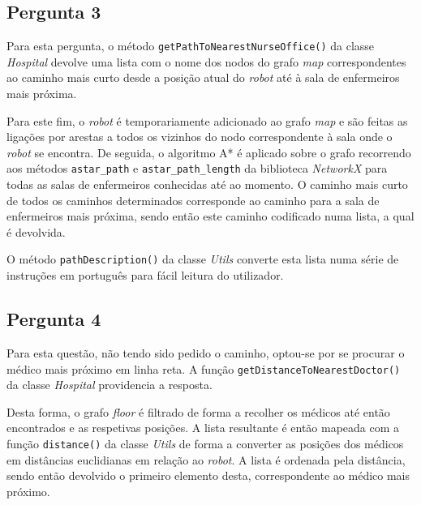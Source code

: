 \subsection{Pergunta 3}
\label{ssec::implement:details:perg3}


Para esta pergunta, o método \texttt{getPathToNearestNurseOffice()} da classe \textit{Hospital} devolve uma lista com o nome dos nodos do grafo \textit{map} correspondentes ao caminho mais curto desde a posição atual do \textit{robot} até à sala de enfermeiros mais próxima.

Para este fim, o \textit{robot} é temporariamente adicionado ao grafo \textit{map} e são feitas as ligações por arestas a todos os vizinhos do nodo correspondente à sala onde o \textit{robot} se encontra. De seguida, o algoritmo A* é aplicado sobre o grafo recorrendo aos métodos \texttt{astar\_path} e \texttt{astar\_path\_length} da biblioteca \textit{NetworkX} para todas as salas de enfermeiros conhecidas até ao momento. O caminho mais curto de todos os caminhos determinados corresponde ao caminho para a sala de enfermeiros mais próxima, sendo então este caminho codificado numa lista, a qual é devolvida.

O método \texttt{pathDescription()} da classe \textit{Utils} converte esta lista numa série de instruções em português para fácil leitura do utilizador.


\subsection{Pergunta 4}
\label{ssec::implement:details:perg4}


Para esta questão, não tendo sido pedido o caminho, optou-se por se procurar o médico mais próximo em linha reta. A função \texttt{getDistanceToNearestDoctor()} da classe \textit{Hospital} providencia a resposta.

Desta forma, o grafo \textit{floor} é filtrado de forma a recolher os médicos até então encontrados e as respetivas posições. A lista resultante é então mapeada com a função \texttt{distance()} da classe \textit{Utils} de forma a converter as posições dos médicos em distâncias euclidianas em relação ao \textit{robot}. A lista é ordenada pela distância, sendo então devolvido o primeiro elemento desta, correspondente ao médico mais próximo.


